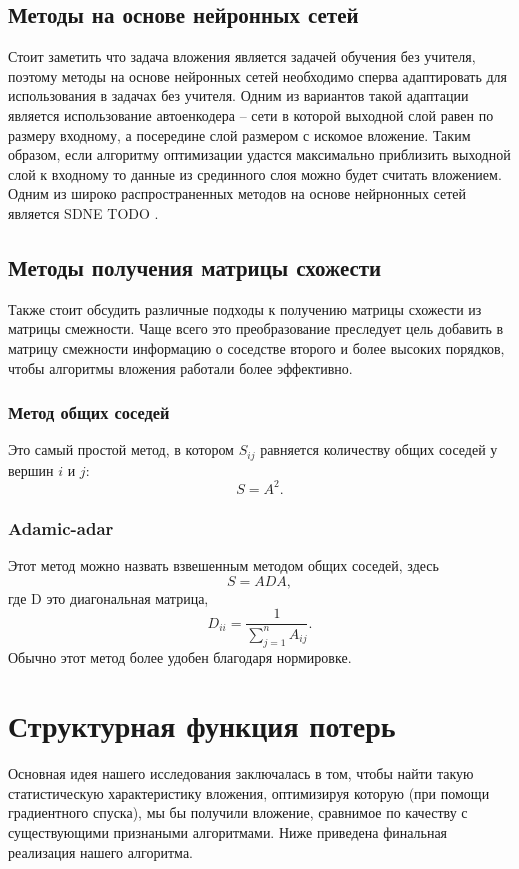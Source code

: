 \documentclass[12pt,a4paper]{extarticle}
\begin{document}
    \subsection{Методы на основе нейронных сетей}
    Стоит заметить что задача вложения является задачей обучения без учителя, поэтому методы на основе нейронных сетей необходимо сперва адаптировать для использования в задачах без учителя.
    Одним из вариантов такой адаптации является использование автоенкодера -- сети в которой выходной слой равен по размеру входному, а посередине слой размером с искомое вложение.
    Таким образом, если алгоритму оптимизации удастся максимально приблизить выходной слой к входному то данные из срединного слоя можно будет считать вложением.
    Одним из широко распространенных методов на основе нейрнонных сетей является SDNE TODO .
    
    \subsection{Методы получения матрицы схожести}
    Также стоит обсудить различные подходы к получению матрицы схожести из матрицы смежности.
    Чаще всего это преобразование преследует цель добавить в матрицу смежности информацию о соседстве второго и более высоких порядков, чтобы алгоритмы вложения работали более эффективно.
    \subsubsection{Метод общих соседей}
    Это самый простой метод, в котором $S_{ij}$ равняется количеству общих соседей у вершин $i$ и $j$:
    \[S = A^2.\]
    \subsubsection{Adamic-adar}
    Этот метод можно назвать взвешенным методом общих соседей, здесь
    \[S = A D A,\]
    где D это диагональная матрица,
    \[D_{ii} = \frac{1}{\sum_{j=1}^n A_{ij}}.\]
    Обычно этот метод более удобен благодаря нормировке.
    
    \section{Структурная функция потерь}
    
    Основная идея нашего исследования заключалась в том, чтобы найти такую статистическую характеристику вложения, оптимизируя которую (при помощи градиентного спуска), мы бы получили вложение, сравнимое по качеству с существующими признаными алгоритмами.
    Ниже приведена финальная реализация нашего алгоритма.
    
\end{document}
